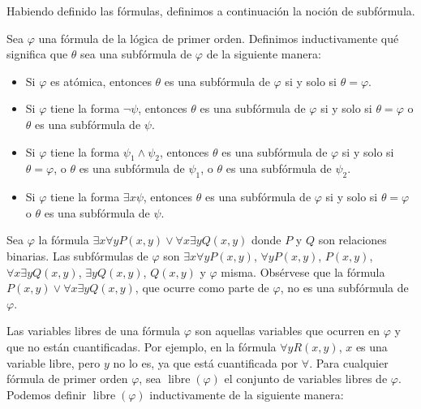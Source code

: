 \message{ !name(main.tex)}\documentclass[12pt,a4paper]{book}
\DeclareMathOperator{\libre}{libre}
\begin{document}
    Habiendo definido las fórmulas, definimos a continuación la noción de subfórmula.

    \begin{definicion}\label{def:subformula-fol}
        Sea $\varphi$ una fórmula de la lógica de primer orden. Definimos inductivamente qué significa que $\theta$ sea una
        subfórmula de $\varphi$ de la siguiente manera:
        \begin{itemize}
            \item[$\bullet$] Si $\varphi$ es atómica, entonces $\theta$ es una subfórmula de $\varphi$ si y solo si $\theta=\varphi$.
            \item[$\bullet$] Si $\varphi$ tiene la forma $\neg\psi$, entonces $\theta$ es una subfórmula de $\varphi$ si y solo si
            $\theta=\varphi$ o $\theta$ es una subfórmula de $\psi$.
            \item[$\bullet$] Si $\varphi$ tiene la forma $\psi_{1}\wedge\psi_{2}$, entonces $\theta$ es una subfórmula de $\varphi$
            si y solo si $\theta=\varphi$, o $\theta$ es una subfórmula de $\psi_{1}$, o $\theta$ es una subfórmula de $\psi_{2}$.
            \item[$\bullet$] Si $\varphi$ tiene la forma $\exists x\psi$, entonces $\theta$ es una subfórmula de $\varphi$ si y
            solo si $\theta=\varphi$ o $\theta$ es una subfórmula de $\psi$.
        \end{itemize}
    \end{definicion}

    \begin{ejemplo}\label{ej:subformulas-fol}
        Sea $\varphi$ la fórmula $\exists x\forall yP(x,y)\vee\forall x\exists yQ(x,y)$ donde $P$ y $Q$ son relaciones
        binarias. Las subfórmulas de $\varphi$ son $\exists x\forall yP(x,y)$, $\forall yP(x,y)$, $P(x,y)$,
        $\forall x\exists yQ(x,y)$, $\exists yQ(x,y)$, $Q(x,y)$ y $\varphi$ misma. Obsérvese que la fórmula
        $P(x,y)\vee\forall x\exists yQ(x,y)$, que ocurre como parte de $\varphi$, no es una subfórmula de $\varphi$.
    \end{ejemplo}

    Las variables libres de una fórmula $\varphi$ son aquellas variables que ocurren en $\varphi$ y que no están
    cuantificadas. Por ejemplo, en la fórmula $\forall yR(x,y)$, $x$ es una variable libre, pero $y$ no lo es, ya que está
    cuantificada por $\forall$. Para cualquier fórmula de primer orden $\varphi$, sea $\libre(\varphi)$ el conjunto de
    variables libres de $\varphi$. Podemos definir $\libre(\varphi)$ inductivamente de la siguiente manera:
\end{document}
